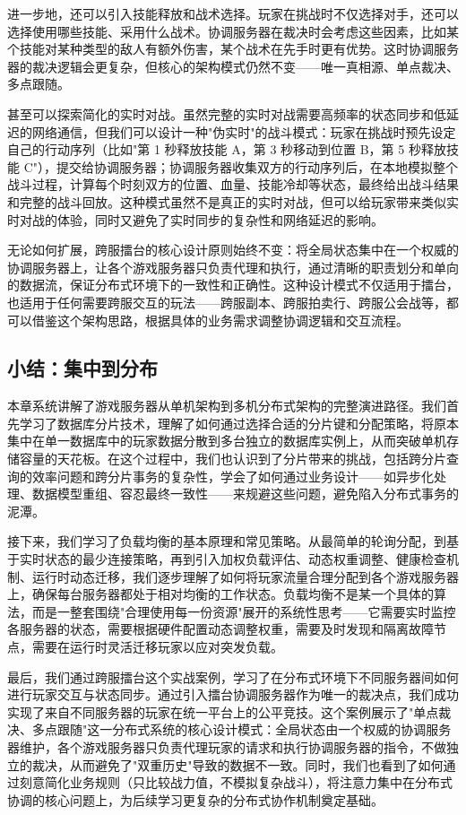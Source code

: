 进一步地，还可以引入技能释放和战术选择。玩家在挑战时不仅选择对手，还可以选择使用哪些技能、采用什么战术。协调服务器在裁决时会考虑这些因素，比如某个技能对某种类型的敌人有额外伤害，某个战术在先手时更有优势。这时协调服务器的裁决逻辑会更复杂，但核心的架构模式仍然不变——唯一真相源、单点裁决、多点跟随。

甚至可以探索简化的实时对战。虽然完整的实时对战需要高频率的状态同步和低延迟的网络通信，但我们可以设计一种"伪实时"的战斗模式：玩家在挑战时预先设定自己的行动序列（比如"第 1 秒释放技能 A，第 3 秒移动到位置 B，第 5 秒释放技能 C"），提交给协调服务器；协调服务器收集双方的行动序列后，在本地模拟整个战斗过程，计算每个时刻双方的位置、血量、技能冷却等状态，最终给出战斗结果和完整的战斗回放。这种模式虽然不是真正的实时对战，但可以给玩家带来类似实时对战的体验，同时又避免了实时同步的复杂性和网络延迟的影响。

无论如何扩展，跨服擂台的核心设计原则始终不变：将全局状态集中在一个权威的协调服务器上，让各个游戏服务器只负责代理和执行，通过清晰的职责划分和单向的数据流，保证分布式环境下的一致性和正确性。这种设计模式不仅适用于擂台，也适用于任何需要跨服交互的玩法——跨服副本、跨服拍卖行、跨服公会战等，都可以借鉴这个架构思路，根据具体的业务需求调整协调逻辑和交互流程。

\subsection{小结：集中到分布}

本章系统讲解了游戏服务器从单机架构到多机分布式架构的完整演进路径。我们首先学习了数据库分片技术，理解了如何通过选择合适的分片键和分配策略，将原本集中在单一数据库中的玩家数据分散到多台独立的数据库实例上，从而突破单机存储容量的天花板。在这个过程中，我们也认识到了分片带来的挑战，包括跨分片查询的效率问题和跨分片事务的复杂性，学会了如何通过业务设计——如异步化处理、数据模型重组、容忍最终一致性——来规避这些问题，避免陷入分布式事务的泥潭。

接下来，我们学习了负载均衡的基本原理和常见策略。从最简单的轮询分配，到基于实时状态的最少连接策略，再到引入加权负载评估、动态权重调整、健康检查机制、运行时动态迁移，我们逐步理解了如何将玩家流量合理分配到各个游戏服务器上，确保每台服务器都处于相对均衡的工作状态。负载均衡不是某一个具体的算法，而是一整套围绕"合理使用每一份资源"展开的系统性思考——它需要实时监控各服务器的状态，需要根据硬件配置动态调整权重，需要及时发现和隔离故障节点，需要在运行时灵活迁移玩家以应对突发负载。

最后，我们通过跨服擂台这个实战案例，学习了在分布式环境下不同服务器间如何进行玩家交互与状态同步。通过引入擂台协调服务器作为唯一的裁决点，我们成功实现了来自不同服务器的玩家在统一平台上的公平竞技。这个案例展示了"单点裁决、多点跟随"这一分布式系统的核心设计模式：全局状态由一个权威的协调服务器维护，各个游戏服务器只负责代理玩家的请求和执行协调服务器的指令，不做独立的裁决，从而避免了"双重历史"导致的数据不一致。同时，我们也看到了如何通过刻意简化业务规则（只比较战力值，不模拟复杂战斗），将注意力集中在分布式协调的核心问题上，为后续学习更复杂的分布式协作机制奠定基础。


\newpage
